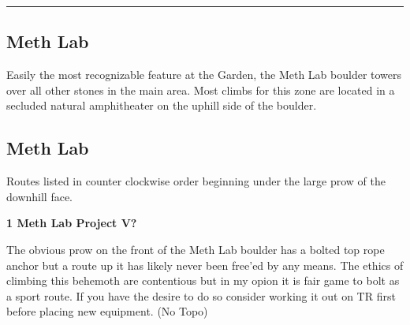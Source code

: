 \rule{\textwidth}{1pt}
\begin{multicols}{2}
		\section{Meth Lab}\label{sa:Meth Lab}
	\begin{minipage}{\columnwidth}
	Easily the most recognizable feature at the Garden, the Meth Lab boulder towers over all other stones in the main area. Most climbs for this zone are located in a secluded natural amphitheater on the uphill side of the boulder.
	\end{minipage}
			\subsection*{Meth Lab}\label{bf:Meth Lab}
			\begin{minipage}{\columnwidth}
			Routes listed in counter clockwise order beginning under the large prow of the downhill face.
			\end{minipage}
			
\label{pt:Octurnal}
					\begin{minipage}{\linewidth}	
					\label{rt:Meth Lab Project}\colorbox{black!20}{\textbf{1 Meth Lab Project V?  \warn \warn \warn }}
					\begin{adjustwidth}{0.5cm}{}				
					The obvious prow on the front of the Meth Lab boulder has a bolted top rope anchor but a route up it has likely never been free'ed by any means. The ethics of climbing this behemoth are contentious but in my opion it is fair game to bolt as a sport route. If you have the desire to do so consider working it out on TR first before placing new equipment.
						\newline (No Topo) 
					\end{adjustwidth}
					\end{minipage}


\end{multicols}

